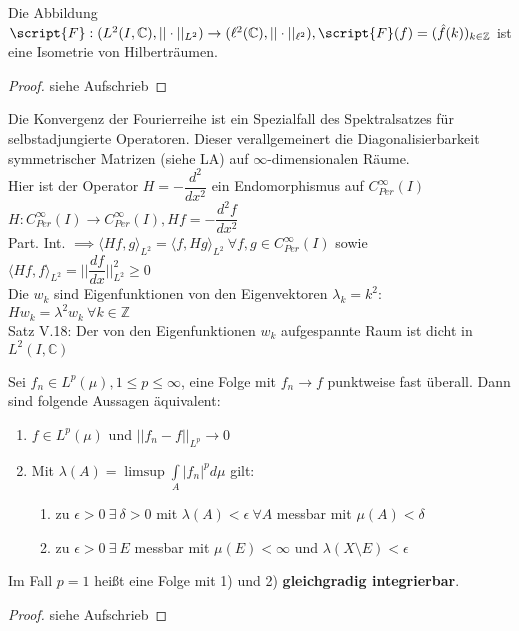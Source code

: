   \newpage
  \begin{lemma}
    Die Abbildung $\script{F}: (L^2(I, \mathbb{C}), ||\cdot||_{L^2}) \to (\ell^2(\mathbb{C}), ||\cdot||_{\ell^2}), \script{F}(f) = (\hat{f}(k))_{k \in \mathbb{Z}}$ ist eine Isometrie von Hilberträumen.
  \end{lemma}
  \begin{proof}
    siehe Aufschrieb
  \end{proof}

  \begin{remark}
    Die Konvergenz der Fourierreihe ist ein Spezialfall des Spektralsatzes für selbstadjungierte Operatoren. Dieser verallgemeinert die Diagonalisierbarkeit symmetrischer Matrizen (siehe LA) auf $\infty$-dimensionalen Räume.\\
    Hier ist der Operator $H = -\dfrac{d^2}{dx^2}$ ein Endomorphismus auf $C_{Per}^{\infty}(I)$\\
    $H:C_{Per}^{\infty}(I) \to C_{Per}^{\infty}(I), Hf=-\dfrac{d^2f}{dx^2}$\\
    Part. Int. $\implies \langle Hf,g \rangle_{L^2} = \langle f,Hg \rangle_{L^2} \ \forall f,g \in C_{Per}^{\infty}(I)$ sowie $\langle Hf, f \rangle_{L^2} = ||\dfrac{df}{dx}||_{L^2}^2 \geq 0$\\
    Die $w_k$ sind Eigenfunktionen von den Eigenvektoren $\lambda_k = k^2$:\\
    $Hw_k = \lambda^2 w_k \ \forall k \in \mathbb{Z}$\\
    Satz V.18: Der von den Eigenfunktionen $w_k$ aufgespannte Raum ist dicht in $L^2(I, \mathbb{C})$
  \end{remark}

  \begin{theorem}[Vitali]
    Sei $f_n \in L^p(\mu), 1 \leq p \leq \infty$, eine Folge mit $f_n \to f$ punktweise fast überall. Dann sind folgende Aussagen äquivalent:
    \begin{enumerate}[label=\alph*)]
      \item $f \in L^p(\mu)$ und $||f_n - f||_{L^p} \to 0$
      \item Mit $\lambda(A) = \limsup \int\limits_A |f_n|^p d\mu$ gilt:
            \begin{enumerate}[label=\arabic*)]
              \item zu $\epsilon > 0 \ \exists \ \delta > 0$ mit $\lambda(A) < \epsilon \ \forall A$ messbar mit $\mu(A) < \delta$
              \item zu $\epsilon > 0 \ \exists \ E$ messbar mit $\mu(E) < \infty$ und $\lambda(X \setminus E) < \epsilon$ 
            \end{enumerate}
    \end{enumerate}
    Im Fall $p = 1$ heißt eine Folge mit 1) und 2) \textbf{gleichgradig integrierbar}.
  \end{theorem}
  \begin{proof}
    siehe Aufschrieb
  \end{proof}

  